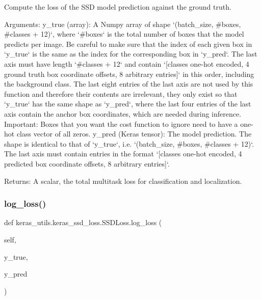 \begin{DoxyVerb}Compute the loss of the SSD model prediction against the ground truth.

Arguments:
    y_true (array): A Numpy array of shape `(batch_size, #boxes, #classes + 12)`,
where `#boxes` is the total number of boxes that the model predicts
per image. Be careful to make sure that the index of each given
box in `y_true` is the same as the index for the corresponding
box in `y_pred`. The last axis must have length `#classes + 12` and contain
`[classes one-hot encoded, 4 ground truth box coordinate offsets, 8 arbitrary entries]`
in this order, including the background class. The last eight entries of the
last axis are not used by this function and therefore their contents are
irrelevant, they only exist so that `y_true` has the same shape as `y_pred`,
where the last four entries of the last axis contain the anchor box
coordinates, which are needed during inference. Important: Boxes that
you want the cost function to ignore need to have a one-hot
class vector of all zeros.
    y_pred (Keras tensor): The model prediction. The shape is identical
to that of `y_true`, i.e. `(batch_size, #boxes, #classes + 12)`.
The last axis must contain entries in the format
`[classes one-hot encoded, 4 predicted box coordinate offsets, 8 arbitrary entries]`.

Returns:
    A scalar, the total multitask loss for classification and localization.
\end{DoxyVerb}
 \mbox{\label{classkeras__utils_1_1keras__ssd__loss_1_1_s_s_d_loss_ac961f7061c048c565a859f8d42159a0d}} 
\subsubsection{\texorpdfstring{log\+\_\+loss()}{log\_loss()}}
{\footnotesize\ttfamily def keras\+\_\+utils.\+keras\+\_\+ssd\+\_\+loss.\+S\+S\+D\+Loss.\+log\+\_\+loss (\begin{DoxyParamCaption}\item[{}]{self,  }\item[{}]{y\+\_\+true,  }\item[{}]{y\+\_\+pred }\end{DoxyParamCaption})}

